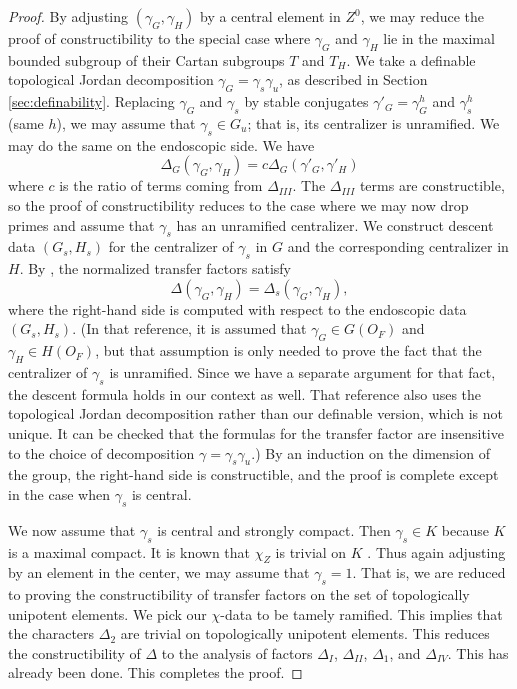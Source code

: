 \begin{proof}
By adjusting $(\gamma_G,\gamma_H)$ by a central element in $Z^0$, we
may reduce the proof of constructibility to the special case where
$\gamma_G$ and $\gamma_H$ lie in the maximal bounded subgroup of their
Cartan subgroups $T$ and $T_H$.  We take a definable topological
Jordan decomposition $\gamma_G = \gamma_s \gamma_u$, as described in
Section \ref{sec:definability}.  Replacing $\gamma_G$ and $\gamma_s$
by stable conjugates $\gamma'_G=\gamma_G^h$ and $\gamma_s^h$ (same
$h$), we may assume that $\gamma_s\in G_u$; that is, its centralizer
is unramified.  We may do the same on the endoscopic side.  We have
\[
\Delta_G(\gamma_G,\gamma_H) = c \Delta_G(\gamma'_G,\gamma'_H)
\]
where $c$ is the ratio of terms coming from $\Delta_{III}$.  The
$\Delta_{III}$ terms are constructible, so the proof of
constructibility reduces to the case where we may now drop primes and
assume that $\gamma_s$ has an unramified centralizer.  We construct
descent data $(G_s,H_s)$ for the centralizer of $\gamma_s$ in $G$ and
the corresponding centralizer in $H$.  By \cite{hales1993simple}, the
normalized transfer factors satisfy
\[
\Delta(\gamma_G,\gamma_H) = \Delta_s(\gamma_G,\gamma_H),
\]
where the right-hand side is computed with respect to the endoscopic
data $(G_s,H_s)$.  (In that reference, it is assumed that $\gamma_G\in
G(O_F)$ and $\gamma_H\in H(O_F)$, but that assumption is only needed
to prove the fact that the centralizer of $\gamma_s$ is unramified.
Since we have a separate argument for that fact, the descent formula
holds in our context as well. That reference also uses the topological
Jordan decomposition rather than our definable version, which is not
unique.  It can be checked that the formulas for the transfer factor are
insensitive to the choice of decomposition $\gamma=\gamma_s\gamma_u$.)
By an induction on the dimension of the group, the right-hand side is
constructible, and the proof is complete except in the case when
$\gamma_s$ is central.

We now assume that $\gamma_s$ is central and strongly compact.  Then
$\gamma_s\in K$ because $K$ is a maximal compact.  It is known that
$\chi_Z$ is trivial on $K$ \cite[Lemma
3.2]{hales1995fundamental}. Thus again adjusting by an element in the
center, we may assume that $\gamma_s=1$.  That is, we are reduced to
proving the constructibility of transfer factors on the set of
topologically unipotent elements.  We pick our $\chi$-data to be
tamely ramified.  This implies that the characters $\Delta_2$ are
trivial on topologically unipotent elements.  This reduces
the constructibility of $\Delta$ to the analysis of factors $\Delta_I$, $\Delta_{II}$,
$\Delta_1$, and $\Delta_{IV}$.  This has already been done.  This
completes the proof.
\end{proof}